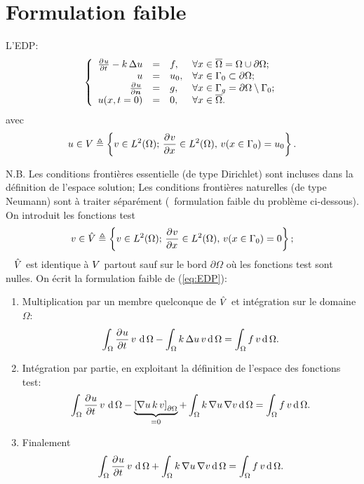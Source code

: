 \documentclass[11pt,a4paper]{article}
\begin{document}
\section{Formulation faible}
%
L'EDP:							
\begin{equation}
\label{eq:EDP}
\left\{
\begin{array}{rcll}
\frac{\partial^{} u}{\partial t^{}} - k\,\Delta u & = & f,  & \forall x \in \overline{\Omega} = \Omega\cup\partial\Omega; \\
u &=& u_0, & \forall x \in \Gamma_0 \subset \partial \Omega;\\
\frac{\partial^{} u}{\partial \boldsymbol{n}^{}} &=& g, & \forall x \in \Gamma_g = \partial \Omega\setminus\Gamma_0;\\
u(x,t=0)&=&0,& \forall x \in \overline{\Omega}.
\end{array}
\right.
\end{equation}
avec $$u\in V \triangleq \left\{v\in L^2(\Omega);\, \frac{\partial^{} v}{\partial x^{}}\in L^2(\Omega), \, v(x\in\Gamma_0)=u_0 \right\}.$$	

N.B. Les conditions frontières essentielle (de type Dirichlet) sont incluses dans la définition de l'espace solution; Les conditions frontières naturelles (de type Neumann) sont à traiter séparément (\cf~formulation faible du problème ci-dessous).
%
On introduit les fonctions test $$v\in\hat{V}\triangleq\left\{v\in L^2(\Omega);\, \frac{\partial^{} v}{\partial x^{}}\in L^2(\Omega), \, v(x\in\Gamma_0)=0 \right\};$$ \ie~ $\hat{V}$ est identique à $V$ partout sauf sur le bord $\partial\Omega$ où les fonctions test sont nulles.
On écrit la formulation faible de (\ref{eq:EDP}):
\begin{enumerate}
\item Multiplication par un membre quelconque de $\hat{V}$ et intégration sur le domaine $\Omega$:
 $$\int_\Omega\frac{\partial^{} u}{\partial t^{}}\, v\,\operatorname{d} \Omega - \int_\Omega k\,\Delta u\, v \operatorname{d} \Omega= \int_\Omega f\, v \operatorname{d} \Omega. $$
 \item Intégration par partie, en exploitant la définition de l'espace des fonctions test: 
 $$\int_\Omega\frac{\partial^{} u}{\partial t^{}}\, v\,\operatorname{d} \Omega - \underbrace{\left[\nabla u\,k \,v \right]_{\partial\Omega}}_{=0} + \int_\Omega k\,\nabla u\, \nabla v \operatorname{d} \Omega= \int_\Omega f\, v \operatorname{d} \Omega. $$
 \item Finalement
 \begin{equation}
 \label{eq:formulation_faible}
\int_\Omega\frac{\partial^{} u}{\partial t^{}}\, v\,\operatorname{d} \Omega + \int_\Omega k\,\nabla u\, \nabla v \operatorname{d} \Omega= \int_\Omega f\, v \operatorname{d} \Omega.
 \end{equation}
\end{enumerate}
\end{document}
